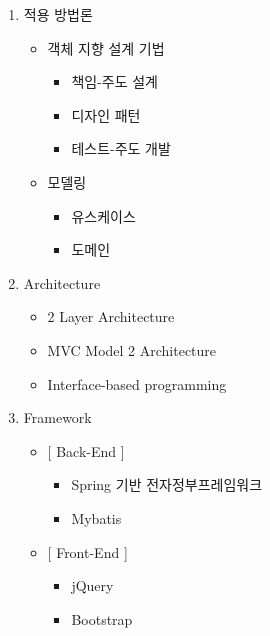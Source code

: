\newpage


\begin{enumerate}
    \item 적용 방법론
        \begin{itemize}
            \item 객체 지향 설계 기법
                \begin{itemize}
                    \item[] 책임-주도 설계
                    \item[] 디자인 패턴
                    \item[] 테스트-주도 개발
                \end{itemize}
        \end{itemize}
        \begin{itemize}
            \item 모델링
                \begin{itemize}
                    \item[] 유스케이스
                    \item[] 도메인
                \end{itemize}
        \end{itemize}
    \item Architecture
        \begin{itemize}
            \item 2 Layer Architecture
            \item MVC Model 2 Architecture
            \item Interface-based programming
        \end{itemize}
    \item Framework
        \begin{itemize}
            \item{} [ Back-End ]
                \begin{itemize}
                    \item[] Spring 기반 전자정부프레임워크
                    \item[] Mybatis 
                \end{itemize}
            \item{} [ Front-End ]
                \begin{itemize}
                    \item[] jQuery
                    \item[] Bootstrap 

\end{itemize}
\end{itemize}
\end{enumerate}
